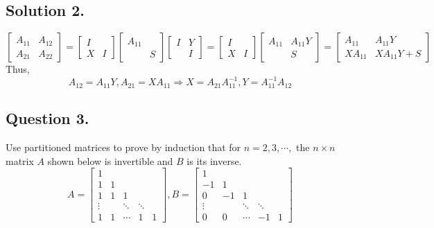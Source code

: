 \documentclass{article}
\begin{document}
\subsection*{Solution 2.}
\[\left[\begin{array}{cc}A_{11}&A_{12}\\A_{21}&A_{22}\end{array}\right]=\left[\begin{array}{cc}I\\X&I\end{array}\right]\left[\begin{array}{cc}A_{11}\\&S\end{array}\right]\left[\begin{array}{cc}I&Y\\&I\end{array}\right]=\left[\begin{array}{cc}I\\X&I\end{array}\right]\left[\begin{array}{cc}A_{11}&A_{11}Y\\&S\end{array}\right]=\left[\begin{array}{cc}A_{11}&A_{11}Y\\XA_{11}&XA_{11}Y+S\end{array}\right]\]
Thus,
\[A_{12}=A_{11}Y,A_{21}=XA_{11}\Rightarrow X=A_{21}A_{11}^{-1},Y=A_{11}^{-1}A_{12}\]
\subsection*{Question 3.}
Use partitioned matrices to prove by induction that for $n=2,3,\cdots,$ the $n\times n$ matrix $A$ shown below is invertible and $B$ is its inverse.
\[A=\left[\begin{array}{ccccc}1\\1&1\\1&1&1\\\vdots&&\ddots&\ddots\\1&1&\cdots&1&1\end{array}\right], B=\left[\begin{array}{rrrrr}1\\-1&1\\0&-1&1\\\vdots&&\ddots&\ddots\\0&0&\cdots&-1&1\end{array}\right]\]
\end{document}
